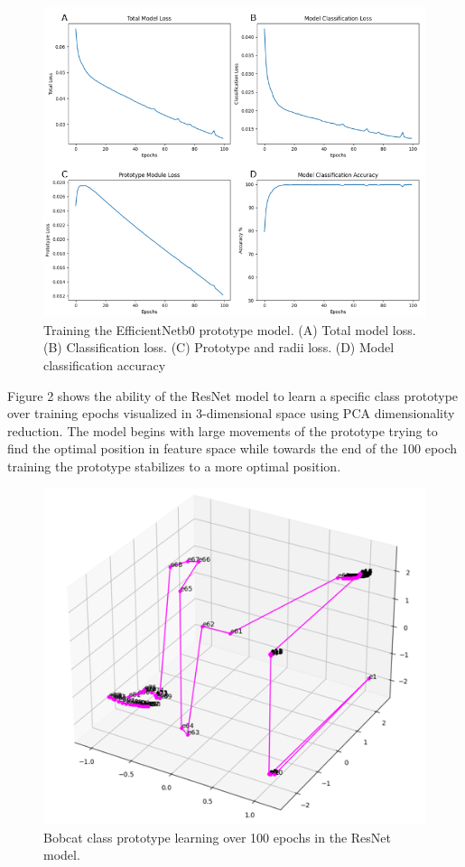 \documentclass[conference]{IEEEtran}
\begin{document}
\begin{figure}
\centerline{\includegraphics[scale=0.5]{Images/EffNet_Prototype_Training.png}}
\caption{Training the EfficientNetb0 prototype model. (A) Total model loss. (B) Classification loss. (C) Prototype and radii loss. (D) Model classification accuracy}
\label{fig}
\end{figure}

Figure 2 shows the ability of the ResNet model to learn a specific class prototype over training epochs visualized in 3-dimensional space using PCA dimensionality reduction. The model begins with large movements of the prototype trying to find the optimal position in feature space while towards the end of the 100 epoch training the prototype stabilizes to a more optimal position.\\

\begin{figure}
\centerline{\includegraphics[scale=0.4]{Images/Prototype_Learning_Over_Epochs.png}}
\caption{Bobcat class prototype learning over 100 epochs in the ResNet model.}
\label{fig}
\end{figure}
\end{document}
